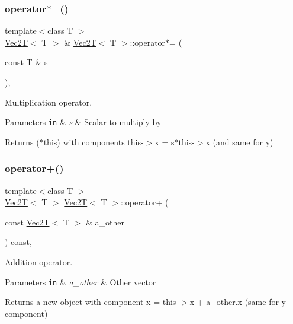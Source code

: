 \subsubsection{\texorpdfstring{operator$\ast$=()}{operator*=()}}
{\footnotesize\ttfamily template$<$class T $>$ \\
\hyperlink{classVec2T}{Vec2T}$<$ T $>$ \& \hyperlink{classVec2T}{Vec2T}$<$ T $>$\+::operator$\ast$= (\begin{DoxyParamCaption}\item[{const T \&}]{s }\end{DoxyParamCaption})\hspace{0.3cm}{\ttfamily [inline]}, {\ttfamily [noexcept]}}



Multiplication operator. 


\begin{DoxyParams}[1]{Parameters}
\mbox{\tt in}  & {\em s} & Scalar to multiply by\\
\hline
\end{DoxyParams}
Returns ($\ast$this) with components this-\/$>$x = s$\ast$this-\/$>$x (and same for y) \mbox{\label{classVec2T_a0ea1e944e722dfdc3a37ebd7ef922eea}} 
\subsubsection{\texorpdfstring{operator+()}{operator+()}}
{\footnotesize\ttfamily template$<$class T $>$ \\
\hyperlink{classVec2T}{Vec2T}$<$ T $>$ \hyperlink{classVec2T}{Vec2T}$<$ T $>$\+::operator+ (\begin{DoxyParamCaption}\item[{const \hyperlink{classVec2T}{Vec2T}$<$ T $>$ \&}]{a\+\_\+other }\end{DoxyParamCaption}) const\hspace{0.3cm}{\ttfamily [inline]}, {\ttfamily [noexcept]}}



Addition operator. 


\begin{DoxyParams}[1]{Parameters}
\mbox{\tt in}  & {\em a\+\_\+other} & Other vector\\
\hline
\end{DoxyParams}
Returns a new object with component x = this-\/$>$x + a\+\_\+other.\+x (same for y-\/component) \mbox{\label{classVec2T_a6f5fbfd88dc2eac09f17fb999c76e5b0}} 
